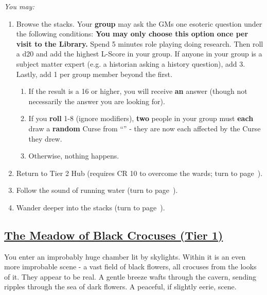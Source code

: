 \documentclass[sheet]{GL2020}
\begin{document}
\vspace{0.5cm}

\begingroup
\itshape
You may:
\begin{enumerate}[A]
  \item Browse the stacks. Your \textbf{group} may ask the GMs one esoteric question under the following conditions:\textbf{ You may only choose this option once per visit to the Library.} Spend 5 minutes role playing doing research. Then roll a d20 and add the highest L-Score in your group. If anyone in your group is a subject matter expert (e.g. a historian asking a history question), add 3. Lastly, add 1 per group member beyond the first.
	\begin{enumerate}
		\item If the result is a 16 or higher, you will receive \textbf{an} answer (though not necessarily the answer you are looking for). 
		\item If you \textbf{roll} 1-8 (ignore modifiers), \textbf{two} people in your group must \textbf{each} draw a \textbf{random} Curse from ``\sCursedCodicesEnvelope{}'' - they are now each affected by the Curse they drew. 
		\item Otherwise, nothing happens.
	\end{enumerate}
	\item Return to Tier 2 Hub (requires CR 10 to overcome the wards; turn to page~\pageref{TierTwoHub}).
	\item Follow the sound of running water (turn to page~\pageref{UpsideDownGrotto}).
	\item Wander deeper into the stacks (turn to page~\pageref{DeeperStacks}).
\end{enumerate}
\endgroup

\clearpage

\begin{center}\section*{\underline{The Meadow of Black Crocuses (Tier 1)}}\end{center}
\label{MeadowofBlackCrocuses}

You enter an improbably huge chamber lit by skylights. Within it is an even more improbable scene - a vast field of black flowers, all crocuses from the looks of it. They appear to be real. A gentle breeze wafts through the cavern, sending ripples through the sea of dark flowers. A peaceful, if slightly eerie, scene.
\end{document}
